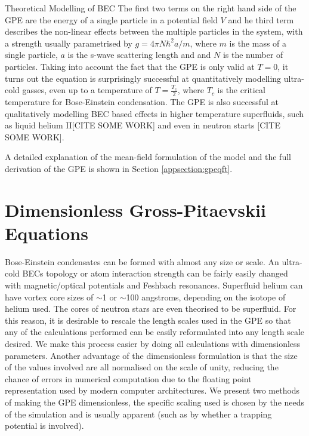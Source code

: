 \begin{chapter}{\label{cha:theoretical_model}Theoretical Modelling of BEC}
The first two terms on the right hand side of the GPE are the energy of a single particle in a potential field $V$ and he third term describes the non-linear effects between the multiple particles in the system, with a strength usually parametrised by $g=4\pi N \hbar^2a/m$,
where $m$ is the mass of a single particle, $a$ is the s-wave scattering length and and $N$ is the number of particles.
Taking into account the fact that the GPE is only valid at $T=0$, it turns out the equation is surprisingly successful at quantitatively modelling ultra-cold gasses, even up to a temperature of $T=\frac{T_c}{2}$, where $T_c$ is the critical temperature for Bose-Einstein condensation. The GPE is also successful at qualitatively modelling BEC based effects in higher temperature superfluids, such as liquid helium II[CITE SOME WORK] and even in neutron starts [CITE SOME WORK].

A detailed explanation of the mean-field formulation of the model and the full derivation of the GPE is shown in Section \ref{appsection:gpeqft}.

\section{\label{section:gpedimless} Dimensionless Gross-Pitaevskii Equations}
	Bose-Einstein condensates can be formed with almost any size or scale. An ultra-cold BECs topology or atom interaction strength can be fairly easily changed with magnetic/optical potentials and Feshbach resonances. Superfluid helium can have vortex core sizes of $\sim$1 or $\sim$100 angstroms, depending on the isotope of helium used. The cores of neutron stars are even theorised to be superfluid. For this reason, it is desirable to rescale the length scales used in the GPE so that any of the calculations performed can be easily reformulated into any length scale desired. We make this process easier by doing all calculations with dimensionless parameters. Another advantage of the dimensionless formulation is that the size of the values involved are all normalised on the scale of unity, reducing the chance of errors in numerical computation due to the floating point representation used by modern computer architectures.
	We present two methods of making the GPE dimensionless, the specific scaling used is chosen by the needs of the simulation and is usually apparent (such as by whether a trapping potential is involved).


\end{chapter}
